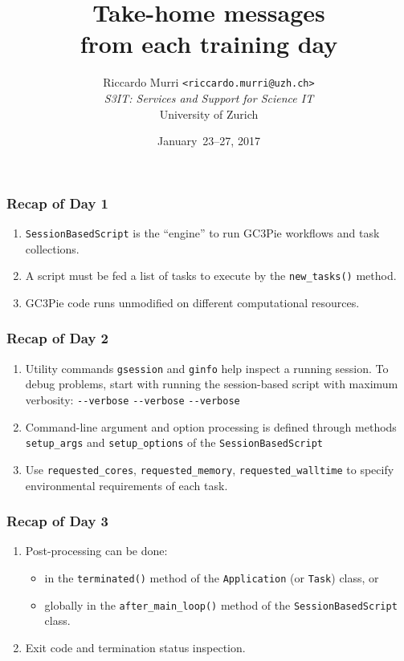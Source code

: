 \documentclass[english,serif,mathserif,xcolor=pdftex,dvipsnames,table]{beamer}
\title[Recap]{%
  Take-home messages \\ from each training day
}
\author[R. Murri, S3IT UZH]{%
  Riccardo Murri \texttt{<riccardo.murri@uzh.ch>}
  \\[1ex]
  \emph{S3IT: Services and Support for Science IT}
  \\[1ex]
  University of Zurich
}
\date{January~23--27, 2017}
\begin{document}
\maketitle


\begin{frame}[fragile]
  \frametitle{Recap of Day 1}

  \begin{enumerate}
  \item \texttt{SessionBasedScript} is the ``engine'' to run GC3Pie workflows and task collections.

  \+\item A script must be fed a list of tasks to execute by the \lstinline|new_tasks()| method.

  \+\item GC3Pie code runs unmodified on different computational resources.
  \end{enumerate}
\end{frame}


\begin{frame}[fragile]
  \frametitle{Recap of Day 2}

  \begin{enumerate}
  \item Utility commands \texttt{gsession} and \texttt{ginfo} help
    inspect a running session.  To debug problems, start with running
    the session-based script with maximum verbosity:
    \texttt{-{}-verbose} \texttt{-{}-verbose} \texttt{-{}-verbose}

    \+\item Command-line argument and option processing is defined through
    methods \lstinline|setup_args| and \lstinline|setup_options| of the
    \texttt{SessionBasedScript}

    \+\item Use \lstinline|requested_cores|,
    \lstinline|requested_memory|, \lstinline|requested_walltime| to
    specify environmental requirements of each task.
  \end{enumerate}
\end{frame}


\begin{frame}
  \frametitle{Recap of Day 3}

  \begin{enumerate}
  \item Post-processing can be done:
    \begin{itemize}
    \item in the \texttt{terminated()} method of the \texttt{Application} (or \texttt{Task}) class, or
    \item globally in the \lstinline|after_main_loop()| method of the \texttt{SessionBasedScript} class.
    \end{itemize}
  \item Exit code and termination status inspection.
  \end{enumerate}
\end{frame}
\end{document}
